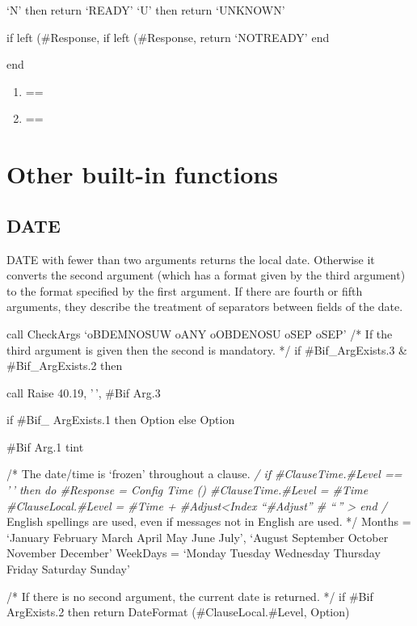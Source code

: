 `N' then return `READY' `U' then return `UNKNOWN'

if left (\#Response, if left (\#Response, return `NOTREADY' end

end

\begin{enumerate}
\def\labelenumi{\arabic{enumi})}
\tightlist
\item
  ==
\item
  ==
\end{enumerate}

\hypertarget{other-built-in-functions}{%
\section{Other built-in functions}\label{other-built-in-functions}}

\hypertarget{date}{%
\subsection{DATE}\label{date}}

DATE with fewer than two arguments returns the local date. Otherwise it
converts the second argument (which has a format given by the third
argument) to the format specified by the first argument. If there are
fourth or fifth arguments, they describe the treatment of separators
between fields of the date.

call CheckArgs `oBDEMNOSUW oANY oOBDENOSU oSEP oSEP' /* If the third
argument is given then the second is mandatory. */ if \#Bif\_ArgExists.3
\& \#Bif\_ArgExists.2 then

call Raise 40.19, '\,', \#Bif Arg.3

if \#Bif\_ ArgExists.1 then Option else Option

\#Bif Arg.1 tint

/* The date/time is `frozen' throughout a clause. \emph{/ if
\#ClauseTime.\#Level == '\,' then do \#Response = Config Time ()
\#ClauseTime.\#Level = \#Time \#ClauseLocal.\#Level = \#Time +
\#Adjust\textless Index ``\#Adjust'' \# ``\,'' \textgreater{} end /}
English spellings are used, even if messages not in English are used. */
Months = `January February March April May June July', `August September
October November December' WeekDays = `Monday Tuesday Wednesday Thursday
Friday Saturday Sunday'

/* If there is no second argument, the current date is returned. */ if
\#Bif ArgExists.2 then return DateFormat (\#ClauseLocal.\#Level, Option)

